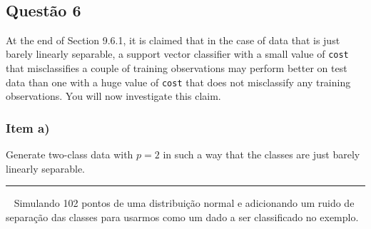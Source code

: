 \documentclass[
  a4paperpaper,
]{article}
\newenvironment{Shaded}{\begin{snugshade}}{\end{snugshade}}
\newcommand{\AttributeTok}[1]{\textcolor[rgb]{0.40,0.45,0.13}{#1}}
\newcommand{\CommentTok}[1]{\textcolor[rgb]{0.37,0.37,0.37}{#1}}
\newcommand{\DecValTok}[1]{\textcolor[rgb]{0.68,0.00,0.00}{#1}}
\newcommand{\FloatTok}[1]{\textcolor[rgb]{0.68,0.00,0.00}{#1}}
\newcommand{\FunctionTok}[1]{\textcolor[rgb]{0.28,0.35,0.67}{#1}}
\newcommand{\NormalTok}[1]{\textcolor[rgb]{0.00,0.23,0.31}{#1}}
\newcommand{\OtherTok}[1]{\textcolor[rgb]{0.00,0.23,0.31}{#1}}
\newcommand{\SpecialCharTok}[1]{\textcolor[rgb]{0.37,0.37,0.37}{#1}}
\newcommand{\StringTok}[1]{\textcolor[rgb]{0.13,0.47,0.30}{#1}}
\begin{document}
~

\subsection{Questão 6}\label{questuxe3o-6}

At the end of Section 9.6.1, it is claimed that in the case of data that
is just barely linearly separable, a support vector classifier with a
small value of \texttt{cost} that misclassifies a couple of training
observations may perform better on test data than one with a huge value
of \texttt{cost} that does not misclassify any training observations.
You will now investigate this claim.

\subsubsection{Item a)}\label{item-a-3}

Generate two-class data with \(p = 2\) in such a way that the classes
are just barely linearly separable.

\begin{center}\rule{0.5\linewidth}{0.5pt}\end{center}

~ Simulando 102 pontos de uma distribuição normal e adicionando um ruido
de separação das classes para usarmos como um dado a ser classificado no
exemplo.

\begin{Shaded}
\end{Shaded}
\end{document}
